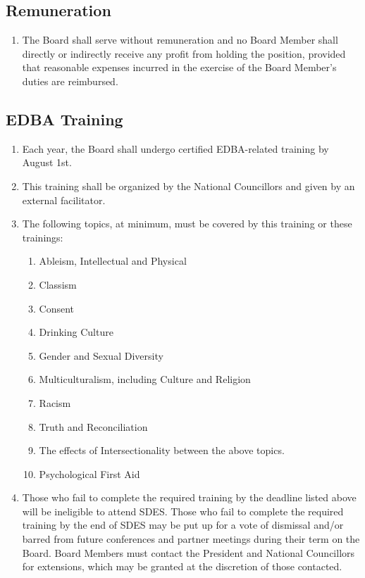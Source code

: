 \subsection{Remuneration}
\label{remuneration}

\begin{enumerate}
 \item
  The Board shall serve without remuneration and no Board Member shall directly or indirectly receive any profit from holding the position, provided that reasonable expenses incurred in the exercise of the Board Member's duties are reimbursed.
\end{enumerate}

\subsection{EDBA Training}
\label{edba-training}

\begin{enumerate}
 \item
  Each year, the Board shall undergo certified EDBA-related training by August 1st.
 \item
  This training shall be organized by the National Councillors and given by an external facilitator.
 \item
  The following topics, at minimum, must be covered by this training or these trainings:
  \begin{enumerate}
   \item
    Ableism, Intellectual and Physical
   \item
    Classism
   \item
    Consent
   \item
    Drinking Culture
   \item
    Gender and Sexual Diversity
   \item
    Multiculturalism, including Culture and Religion
   \item
    Racism
   \item
    Truth and Reconciliation
   \item
    The effects of Intersectionality between the above topics.
   \item
    Psychological First Aid
  \end{enumerate}
 \item
  Those who fail to complete the required training by the deadline listed above will be ineligible to attend SDES. Those who fail to complete the required training by the end of SDES may be put up for a vote of dismissal and/or barred from future conferences and partner meetings during their term on the Board. Board Members must contact the President and National Councillors for extensions, which may be granted at the discretion of those contacted.

\end{enumerate}

